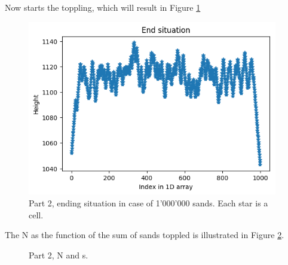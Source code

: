 \documentclass{article}
\begin{document}
Now starts the toppling, which will result in Figure \ref{fig:part2end106}

\begin{figure}[!hbt]
	\centering
	\includegraphics[width=4.3in]{part2end106}
	\caption{Part 2, ending situation in case of 1'000'000 sands. Each star is a cell.}
	\label{fig:part2end106}
\end{figure}

The N as the function of the sum of sands toppled is illustrated in Figure \ref{fig:part2sa}.

\begin{figure}[!hbt]
	\centering
	\caption{Part 2, N and s.}
	\label{fig:part2sa}
\end{figure}
\end{document}
